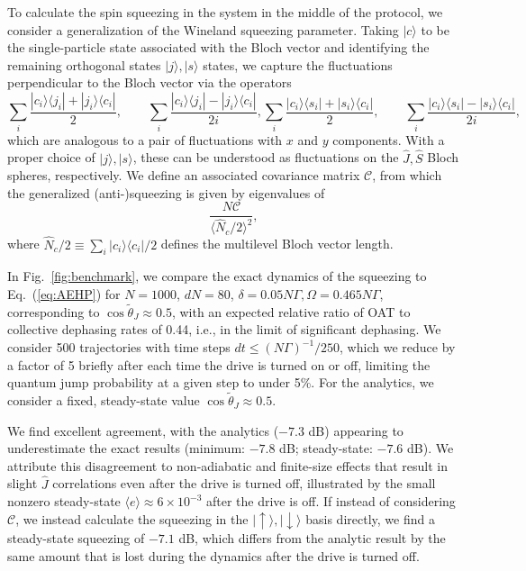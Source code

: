 \documentclass[11pt]{article}
\begin{document}
To calculate the spin squeezing in the system in the middle of the protocol, we consider a generalization of the Wineland squeezing parameter. Taking $|c \rangle$ to be the single-particle state associated with the Bloch vector and identifying the remaining orthogonal states $|j\rangle, |s\rangle$ states, we capture the fluctuations perpendicular to the Bloch vector via the operators
\begin{subequations}
    \begin{equation}
         \sum_i \frac{|c_i \rangle \langle j_i| + |j_i \rangle \langle c_i|}{2}, \qquad
         \sum_i \frac{|c_i \rangle \langle j_i| - |j_i \rangle \langle c_i|}{2i},
    \end{equation}
    \begin{equation}
        \sum_i \frac{|c_i \rangle \langle s_i| + |s_i \rangle \langle c_i|}{2}, \qquad
        \sum_i \frac{|c_i \rangle \langle s_i| - |s_i \rangle \langle c_i|}{2i},
    \end{equation}
\end{subequations}
which are analogous to a pair of fluctuations with $x$ and $y$ components. With a proper choice of $|j\rangle,|s\rangle$, these can be understood as fluctuations on the $\hat J, \hat S$ Bloch spheres, respectively. We define an associated covariance matrix $\mathcal{C}$, from which the generalized (anti-)squeezing is given by eigenvalues of
\begin{equation}
    \frac{ N \mathcal{C}}{\langle \hat N_c/2\rangle^2},
\end{equation}
where $\hat N_c/2 \equiv \sum_i |c_i \rangle \langle c_i|/2$ defines the multilevel Bloch vector length. 

In Fig.~\ref{fig:benchmark}, we compare the exact dynamics of the squeezing to Eq.~(\ref{eq:AEHP}) for $N=1000$, $dN = 80$, $ \delta = 0.05 N \Gamma, \Omega = 0.465 N \Gamma$, corresponding to $\cos \tilde{\theta}_J \approx 0.5$, with an expected relative ratio of OAT to collective dephasing rates of 0.44, i.e., in the limit of significant dephasing. We consider 500 trajectories with time steps $dt \leq (N \Gamma)^{-1}/250$, which we reduce by a factor of 5 briefly after each time the drive is turned on or off, limiting the quantum jump probability at a given step to under 5\%. For the analytics, we consider a fixed, steady-state value $\cos \tilde{\theta}_J \approx 0.5$. 

We find excellent agreement, with the analytics ($-7.3$ dB) appearing to underestimate the exact results (minimum: $-7.8$ dB; steady-state: $-7.6$ dB). We attribute this disagreement to non-adiabatic and finite-size effects that result in slight $\hat J$ correlations even after the drive is turned off, illustrated by the small nonzero steady-state $\langle e \rangle \approx 6 \times 10^{-3}$ after the drive is off. If instead of considering $\mathcal{C}$, we instead calculate the squeezing in the $|{\uparrow}\rangle,|{\downarrow}\rangle$ basis directly, we find a steady-state squeezing of $-7.1$ dB, which differs from the analytic result by the same amount that is lost during the dynamics after the drive is turned off.
\end{document}
